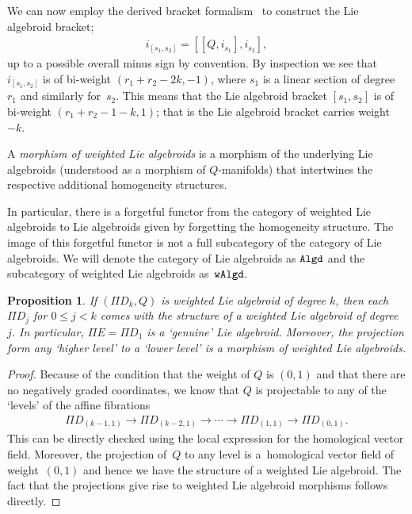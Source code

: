 \documentclass[pdftex]{sigma}
\newcommand{\catname}[1]{\textnormal{\texttt{#1}}}
\numberwithin{equation}{section}
\newtheorem{Proposition}[Theorem]{Proposition}
 { \theoremstyle{definition}
\newtheorem{Definition}[Theorem]{Definition}
\newtheorem{Example}[Theorem]{Example}
\newtheorem{Remark}[Theorem]{Remark} }
\begin{document}
We can now employ the derived bracket formalism~\cite{Kosmann-Schwarzbach:2004} to construct the Lie algebroid bracket;
\begin{gather*}%
i_{[s_{1}, s_{2}]} = [[Q, i_{s_{1}}], i_{s_{2}}],
\end{gather*}
 up to a possible overall minus sign by convention. By inspection we see that $i_{[s_{1}, s_{2}]}$ is of bi-weight $(r_{1}+ r_{2}- 2k, -1)$, where $s_{1}$ is a linear section of degree~$r_{1}$ and similarly for~$s_{2}$. This  means that the Lie algebroid bracket $[s_{1},s_{2}]$ is of bi-weight $(r_{1} + r_{2}-1 -k, 1)$; that is the Lie algebroid bracket carries weight~$-k$.


\begin{Definition}
A \emph{morphism of weighted Lie algebroids} is a morphism of the underlying Lie algebroids (understood as a morphism of $Q$-manifolds) that intertwines the respective additional homogeneity structures.
\end{Definition}

 In particular,  there is a forgetful functor from the category of weighted Lie algebroids to Lie algebroids given by forgetting the homogeneity structure. The image of this forgetful functor is  not a full subcategory of the category of Lie algebroids.  We will denote the category of Lie algebroids as $\catname{Algd}$ and the subcategory of weighted Lie algebroids as~$\catname{wAlgd}$.


 \begin{Proposition}\label{prop:algebroid tower}
 If $(\Pi D_{k}, Q)$ is weighted Lie algebroid of degree $k$, then each $\Pi D_{j}$ for $0\leq j < k$ comes with the structure of a weighted Lie algebroid of degree $j$. In particular, $\Pi E = \Pi D_{1}$ is a `genuine' Lie algebroid. Moreover,  the projection form any `higher level' to a `lower level' is a morphism of weighted Lie algebroids.
  \end{Proposition}

 \begin{proof}
 Because of the condition that the weight of $Q$ is $(0,1)$ and that there are no negatively graded coordinates, we know that $Q$ is projectable to any of the `levels' of the af\/f\/ine f\/ibrations
 \begin{gather}\label{eqn:levels}
 \Pi D_{(k-1,1)} \rightarrow \Pi D_{(k-2, 1)} \rightarrow \cdots \rightarrow \Pi D_{(1,1)} \rightarrow \Pi D_{(0,1)}.
  \end{gather}
  \noindent This can be directly checked using the local expression for the homological vector f\/ield. Moreover, the projection of~$Q$ to any level is a~homological vector f\/ield of weight~$(0,1)$ and hence we have  the structure of a weighted Lie algebroid. The fact that the projections give rise to weighted Lie algebroid morphisms follows directly.
 \end{proof}
\end{document}
